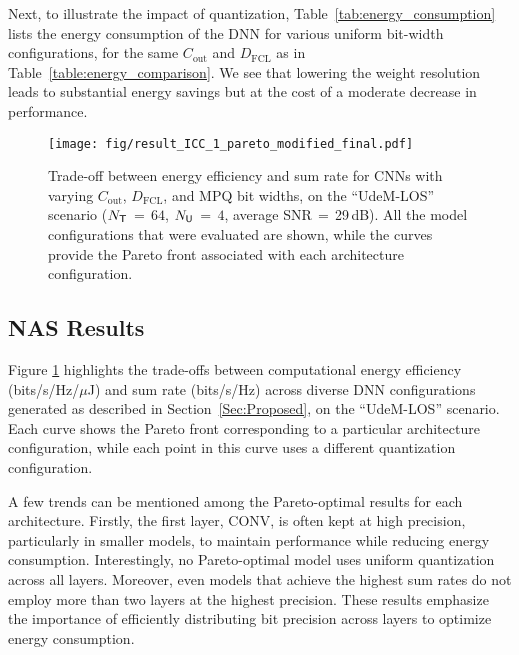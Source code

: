 Next, to illustrate the impact of quantization, 
Table~\ref{tab:energy_consumption} lists the energy consumption of the DNN for various uniform bit-width configurations, for the same $C_{\text{out}}$ and $D_{\text{FCL}}$ as in Table~\ref{table:energy_comparison}. We see that lowering the weight resolution leads to substantial energy savings but at the cost of a moderate decrease in performance.

\begin{figure}[!t]
    \centering
    \texttt{[image: fig/result\_ICC\_1\_pareto\_modified\_final.pdf]}
    \caption{Trade-off between energy efficiency and sum rate for \glspl{CNN} with varying $C_{\text{out}}$, $D_{\text{FCL}}$, and MPQ bit widths, on the ``UdeM-LOS'' scenario ($N_{\sf{T}}$\,$=$\,$64$, $N_{\sf{U}}$\,$=$\,$4$, average SNR\,$=$\,29\,dB). All the model configurations that were evaluated are shown, while the curves provide the Pareto front associated with each architecture configuration.}
    \label{fig:Neural Architecture Search (NAS)}
    \vspace{-10pt}
\end{figure}

\subsection{NAS Results}

Figure \ref{fig:Neural Architecture Search (NAS)} highlights the trade-offs between computational energy efficiency (bits/s/Hz/$\mu$J) and sum rate (bits/s/Hz) across diverse \gls{DNN} configurations generated as described in Section~\ref{Sec:Proposed}, on the ``UdeM-LOS'' scenario.
Each curve shows the Pareto front corresponding to a particular architecture configuration, while each point in this curve uses a different quantization configuration.

A few trends can be mentioned among the Pareto-optimal results for each architecture.
Firstly, the first layer, CONV, is often kept at high precision, particularly in smaller models, to maintain performance while reducing energy consumption. Interestingly, no Pareto-optimal model uses uniform quantization across all layers. Moreover, even models that achieve the highest sum rates do not employ more than two layers at the highest precision. These results emphasize the importance of efficiently distributing bit precision across layers to optimize energy consumption.

